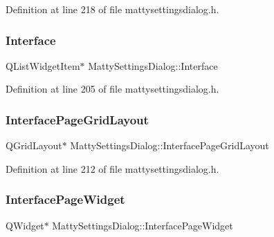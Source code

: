 Definition at line 218 of file mattysettingsdialog.\+h.

\hypertarget{classMattySettingsDialog_aa507ec4d06a64cbc2f6748c67ff0df1e}{}\label{classMattySettingsDialog_aa507ec4d06a64cbc2f6748c67ff0df1e} 
\subsubsection{\texorpdfstring{Interface}{Interface}}
{\footnotesize\ttfamily Q\+List\+Widget\+Item$\ast$ Matty\+Settings\+Dialog\+::\+Interface\hspace{0.3cm}{\ttfamily [private]}}



Definition at line 205 of file mattysettingsdialog.\+h.

\hypertarget{classMattySettingsDialog_ad2b26a023e7e9541c34c4e1aba800a8e}{}\label{classMattySettingsDialog_ad2b26a023e7e9541c34c4e1aba800a8e} 
\subsubsection{\texorpdfstring{Interface\+Page\+Grid\+Layout}{InterfacePageGridLayout}}
{\footnotesize\ttfamily Q\+Grid\+Layout$\ast$ Matty\+Settings\+Dialog\+::\+Interface\+Page\+Grid\+Layout\hspace{0.3cm}{\ttfamily [private]}}



Definition at line 212 of file mattysettingsdialog.\+h.

\hypertarget{classMattySettingsDialog_aa5207929e832b669595789eb430320cb}{}\label{classMattySettingsDialog_aa5207929e832b669595789eb430320cb} 
\subsubsection{\texorpdfstring{Interface\+Page\+Widget}{InterfacePageWidget}}
{\footnotesize\ttfamily Q\+Widget$\ast$ Matty\+Settings\+Dialog\+::\+Interface\+Page\+Widget\hspace{0.3cm}{\ttfamily [private]}}



